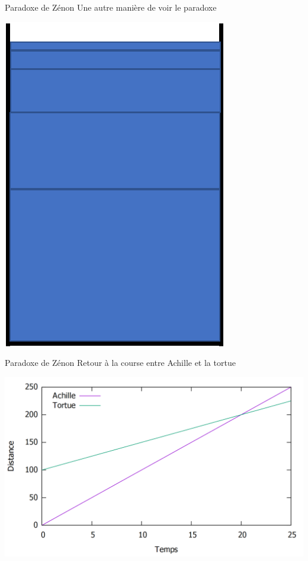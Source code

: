 \documentclass[11pt]{beamer}
\begin{document}
\begin{frame}{Paradoxe de Zénon}
Une autre manière de voir le paradoxe
\begin{center}
	\includegraphics[scale=0.5]{glass5.png}
\end{center}
\end{frame}
\begin{frame}{Paradoxe de Zénon}
Retour à la course entre Achille et la tortue 
\pause
\begin{center}
	\includegraphics[scale=0.35]{ZAPT2.png}
\end{center}
\end{frame}
\end{document}
